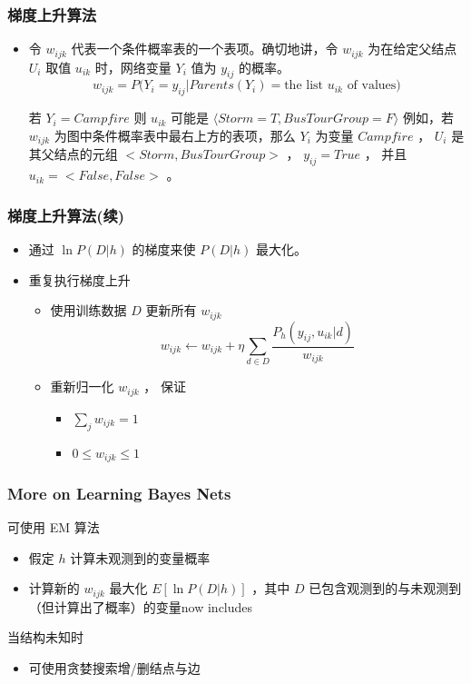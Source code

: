 \documentclass{beamer}
\begin{document}
\begin{frame}
\frametitle{梯度上升算法}
\label{sec-8-9}


\begin{itemize}
\item 令 $w_{ijk}$ 代表一个条件概率表的一个表项。确切地讲，令 $w_{ijk}$  为在给定父结点 $U_i$ 取值 $u_{ik}$ 时，网络变量 $Y_i$ 值为 $y_{ij}$ 的概率。
    $$w_{ijk} = P(Y_i=y_{ij} | Parents(Y_i) = \mbox{the list $u_{ik}$ of values)}$$

    若  $Y_i = Campfire$ 则 $u_{ik}$ 可能是 $\langle Storm=T, BusTourGroup=F \rangle$
    例如，若 $w_{ijk}$ 为图中条件概率表中最右上方的表项，那么 $Y_i$ 为变量 $Campfire$ ， 
    $U_i$ 是其父结点的元组 $<Storm, BusTourGroup>$ ， $y_{ij}=True$ ， 并且 $u_{ik}=<False, False>$ 。
\end{itemize}
\end{frame}
\begin{frame}
\frametitle{梯度上升算法(续)}
\label{sec-8-10}

\begin{itemize}
\item 通过 $\ln P(D|h)$ 的梯度来使 $P(D|h)$ 最大化。
\item 重复执行梯度上升
\begin{itemize}
\item 使用训练数据 $D$ 更新所有 $w_{ijk}$ 
    $$w_{ijk} \leftarrow w_{ijk} + \eta \sum_{d \in D} \frac{P_h(y_{ij}, u_{ik} |d)}{w_{ijk}}$$
\item 重新归一化 $w_{ijk}$ ， 保证
\begin{itemize}
\item $\sum_{j} w_{ijk} = 1$
\item $0 \leq w_{ijk} \leq 1$
\end{itemize}
\end{itemize}
\end{itemize}
\end{frame}
\begin{frame}
\frametitle{More on Learning Bayes Nets}
\label{sec-8-11}


可使用 EM 算法
\begin{itemize}
\item 假定 $h$ 计算未观测到的变量概率
\item 计算新的 $w_{ijk}$ 最大化 $E[\ln P(D|h)]$ ，其中 $D$ 已包含观测到的与未观测到（但计算出了概率）的变量now includes
\end{itemize}

当结构未知时
\begin{itemize}
\item 可使用贪婪搜索增/删结点与边
\end{itemize}
\end{frame}
\end{document}
